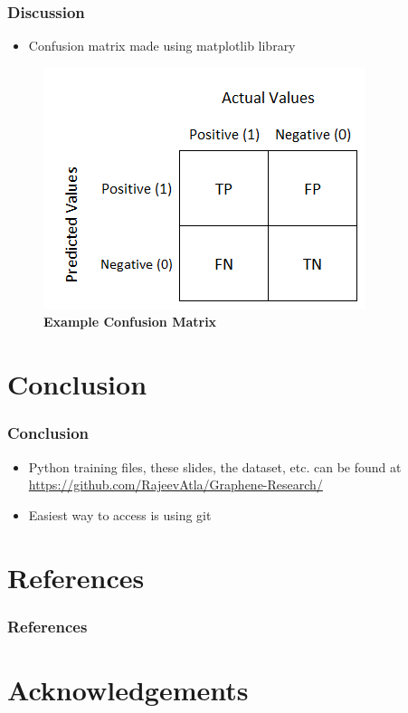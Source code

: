 \documentclass[12pt]{beamer}
\begin{document}
\begin{frame}
\frametitle{Discussion}
\pause
\begin{itemize}
  \item Confusion matrix made using matplotlib library
\end{itemize}
\pause
\begin{figure}[h]
  \includegraphics[scale = 0.5]{confusionmatrix.png}
  \caption{\textbf{Example Confusion Matrix}}
\end{figure}

\end{frame}

\section{Conclusion}

\begin{frame}
\frametitle{Conclusion}
\pause
\begin{itemize}
  \item Python training files, these slides, the dataset, etc. can be found at \url{https://github.com/RajeevAtla/Graphene-Research/}
  \pause
  \item Easiest way to access is using git
\end{itemize}



\end{frame}

\section{References}
\begin{frame}
\frametitle{References}
\end{frame}


\section{Acknowledgements}
\end{document}
